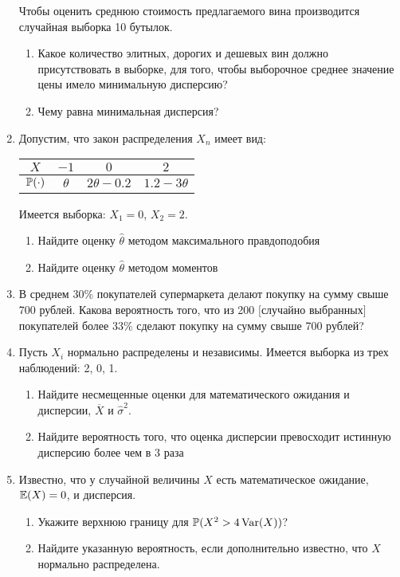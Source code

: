 \begin{enumerate}
Чтобы оценить среднюю стоимость предлагаемого вина производится
случайная выборка 10 бутылок.
\begin{enumerate}
\item Какое количество элитных, дорогих и дешевых вин должно
присутствовать в выборке, для того, чтобы выборочное среднее
значение цены имело минимальную дисперсию?
\item Чему равна минимальная дисперсия?
\end{enumerate}

\item Допустим, что закон распределения $X_{n}$ имеет вид:

\begin{tabular}{@{}cccc@{}}
\toprule
$X$      & $-1$     & $0$             & $2$             \\ \midrule
$\P(\cdot)$ & $\theta$ & $2\theta - 0.2$ & $1.2 - 3\theta$ \\ \bottomrule
\end{tabular}


Имеется выборка: $X_{1}=0$, $X_{2}=2$.
\begin{enumerate}
\item Найдите оценку $\hat{\theta}$ методом максимального правдоподобия
\item Найдите оценку $\hat{\theta}$ методом моментов
\end{enumerate}

\item В среднем 30\% покупателей супермаркета делают покупку на сумму
свыше 700 рублей. Какова вероятность того, что из 200 $[$случайно
выбранных$]$ покупателей
более 33\% сделают покупку на сумму свыше 700 рублей?

\item Пусть $X_{i}$ нормально распределены и
независимы. Имеется выборка
из трех наблюдений: 2, 0, 1.
\begin{enumerate}
\item Найдите несмещенные оценки для математического ожидания и
дисперсии, $\overline{X}$ и $\hat{\sigma}^{2}$.
\item Найдите вероятность того, что оценка дисперсии превосходит
истинную дисперсию более чем в 3 раза
\end{enumerate}

\item Известно, что у случайной величины $X$ есть
математическое
ожидание, $\E(X)=0$, и дисперсия.
\begin{enumerate}
\item Укажите верхнюю границу для $\P(X^{2}>4\Var(X))$?
\item Найдите указанную вероятность, если дополнительно известно, что
$X$ нормально распределена.
\end{enumerate}


\end{enumerate}
